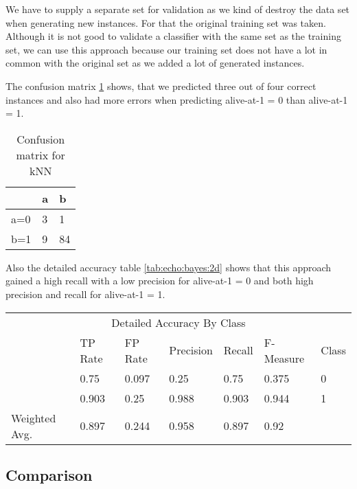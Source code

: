 \documentclass[paper=a4, fontsize=11pt]{scrartcl} %
\numberwithin{equation}{section} %
\numberwithin{figure}{section} %
\numberwithin{table}{section} %
\begin{document}
We have to supply a separate set for validation as we kind of destroy the data set when generating new instances. For that the original training set was taken. Although it is not good to validate a classifier with the same set as the training set, we can use this approach because our training set does not have a lot in common with the original set as we added a lot of generated instances.


The confusion matrix \ref{tab:echo:bayes:2c} shows, that we predicted three out of four correct instances and also had more errors when predicting alive-at-1 = 0 than  alive-at-1 = 1.

\begin{table}[h]
\centering
\begin{tabular}{|l|ll|}
\hline
 & a &	b \\
\hline
a=0 & 3 & 1 \\
b=1 & 9 & 84\\
\hline
\end{tabular}
\caption{Confusion matrix for kNN}
\label{tab:echo:bayes:2c}
\end{table}

Also the detailed accuracy table \ref{tab:echo:bayes:2d} shows that this approach gained a high recall with a low precision for alive-at-1 = 0 and both high precision and recall for alive-at-1 = 1.

\begin{table*}[htb]\centering
  \begin{tabular*}{\columnwidth}{@{}lllllll@{}}
      \toprule 
      \multicolumn{7}{c}{Detailed Accuracy By Class} \\ 
              &  TP Rate & FP Rate & Precision & Recall & F-Measure & Class    \\  \midrule
              &   0.75   & 0.097   & 0.25      & 0.75   & 0.375     & 0 \\
              &   0.903  & 0.25    & 0.988     & 0.903  & 0.944     & 1 \\
Weighted Avg. &   0.897  & 0.244   & 0.958     & 0.897  & 0.92      &   \\ \bottomrule
  \end{tabular*}
\caption{Naive Bayes with SMOTE filter} 
\label{tab:echo:bayes:2d}
\end{table*}


\subsection{Comparison}
\end{document}
